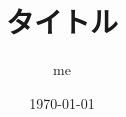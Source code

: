 \documentclass[unicode,aspectratio=169,12pt,xcolor=dvipsnames]{beamer}%
\title{タイトル} %
\author{me} %
\date{\today} %
\begin{document}
\titlepage

\begin{frame}[fragile]
  \frametitle{ }
  
\end{frame}
\end{document}
